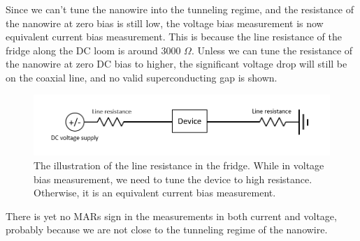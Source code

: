 Since we can't tune the nanowire into the tunneling regime, and the resistance of the nanowire at zero bias is still low, the voltage bias measurement is now equivalent current bias measurement. This is because the line resistance of the fridge along the DC loom is around 3000 $\Omega$. Unless we can tune the resistance of the nanowire at zero DC bias to higher, the significant voltage drop will still be on the coaxial line, and no valid superconducting gap is shown. 

\begin{figure}
    \centering
    \includegraphics[width=\textwidth]{Pic/lineR.png}
    \caption{The illustration of the line resistance in the fridge. While in voltage bias measurement, we need to tune the device to high resistance. Otherwise, it is an equivalent current bias measurement.}
    \label{fig:my_label}
\end{figure}

There is yet no MARs sign in the measurements in both current and voltage, probably because we are not close to the tunneling regime of the nanowire. 

